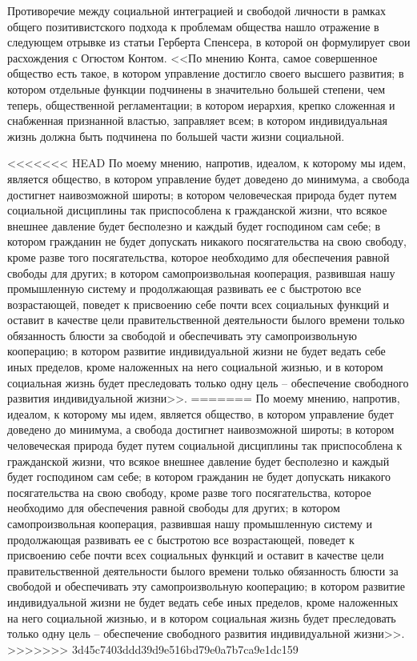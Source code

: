 \documentclass{book}
\begin{document}
Противоречие между социальной интеграцией и свободой личности в рамках общего позитивистского подхода к пробле­мам общества нашло отражение в следующем отрывке из статьи Герберта Спенсера, в которой он формулирует свои расхож­дения с Огюстом Контом.
<<По мнению Конта, самое совершенное общество есть такое, в котором управление  достигло своего высшего развития; в котором отдельные функции подчинены в значительно большей степени, чем теперь, общественной регламентации; в котором иерархия, крепко сложенная и снабженная признанной властью, заправляет всем; в котором индивидуальная жизнь должна быть подчинена по большей части жизни социальной.

<<<<<<< HEAD
По моему мнению, напротив, идеалом, к которому мы идем, является общество, в котором управление  будет доведено до минимума, а свобода достигнет наивозможной широты; в ко­тором человеческая природа будет путем социальной дисцип­лины так приспособлена к гражданской жизни, что всякое внешнее давление будет бесполезно и каждый будет господи­ном сам себе; в котором гражданин не будет допускать ника­кого посягательства на свою свободу, кроме разве того пося­гательства, которое необходимо для обеспечения равной сво­боды для других; в котором самопроизвольная кооперация, развившая нашу промышленную систему и продолжающая раз­вивать ее с быстротою все возрастающей, поведет к присвоению себе почти всех социальных функций и оставит в качестве цели правительственной деятельности былого времени только обя­занность блюсти за свободой и обеспечивать эту самопроизволь­ную кооперацию; в котором развитие индивидуальной жизни не будет ведать себе иных пределов, кроме наложенных на не­го социальной жизнью, и в котором социальная жизнь будет преследовать только одну цель -- обеспечение свободного раз­вития индивидуальной жизни>>.
=======
По моему мнению, напротив, идеалом, к которому мы идем, является общество, в котором управление  будет доведено до минимума, а свобода достигнет наивозможной широты; в ко­тором человеческая природа будет путем социальной дисцип­лины так приспособлена к гражданской жизни, что всякое внешнее давление будет бесполезно и каждый будет господи­ном сам себе; в котором гражданин не будет допускать ника­кого посягательства на свою свободу, кроме разве того пося­гательства, которое необходимо для обеспечения равной сво­боды для других; в котором самопроизвольная кооперация, развившая нашу промышленную систему и продолжающая раз­вивать ее с быстротою все возрастающей, поведет к присвоению себе почти всех социальных функций и оставит в качестве цели правительственной деятельности былого времени только обя­занность блюсти за свободой и обеспечивать эту самопроизволь­ную кооперацию; в котором развитие индивидуальной жизни не будет ведать себе иных пределов, кроме наложенных на не­го социальной жизнью, и в котором 
социальная жизнь будет преследовать только одну цель -- обеспечение свободного раз­вития индивидуальной жизни>>.
>>>>>>> 3d45c7403ddd39d9e516bd79e0a7b7ca9e1dc159
\end{document}
